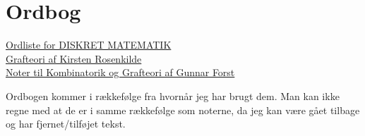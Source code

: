 \chapter{Ordbog}

\begin{note}[Kilder]
  \href{https://first.math.aau.dk/dan/2015/dmat/?file=dictionary.pdf}{Ordliste for DISKRET MATEMATIK}\\
  \noindent
  \href{https://www.georgmohr.dk/noter/grafteori2014.pdf}{Grafteori af Kirsten Rosenkilde}\\
  \noindent
  \href{https://noter.math.ku.dk/dis1-01.pdf}{Noter til Kombinatorik og Grafteori af Gunnar Forst}
\end{note}

Ordbogen kommer i rækkefølge fra hvornår jeg har brugt dem. Man kan ikke regne med at de er i samme rækkefølge som noterne, da jeg kan være gået tilbage og har fjernet/tilføjet tekst.

